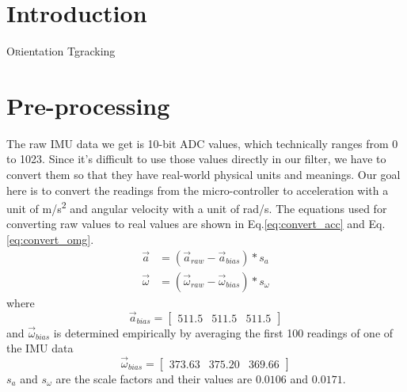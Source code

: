 \documentclass[twoside]{article}
\begin{document}
\begin{multicols}{2} %

\section{Introduction}
\lettrine[nindent=0em,lines=2]{O}rientation Tgracking


\section{Pre-processing}
The raw IMU data we get is 10-bit ADC values, which technically ranges from 0 to 1023. Since it's difficult to use those values directly in our filter, we have to convert them so that they have real-world physical units and meanings. Our goal here is to convert the readings from the micro-controller to acceleration with a unit of \si{m/s^2} and angular velocity with a unit of \si{\radian/s}.
The equations used for converting raw values to real values are shown in Eq.\ref{eq:convert_acc} and Eq.\ref{eq:convert_omg}.
\begin{align}
\label{eq:convert_acc}
\vec{a} &= (\vec{a}_{raw} - \vec{a}_{bias}) * s_{a}\\
\vec{\omega} &= (\vec{\omega}_{raw} - \vec{\omega}_{bias}) * s_{\omega}
\label{eq:convert_omg}
\end{align}
where 
\begin{equation}
\vec{a}_{bias} = \begin{bmatrix}511.5 & 511.5 & 511.5\end{bmatrix}
\end{equation}
and $\vec{\omega}_{bias}$ is determined empirically by averaging the first 100 readings of one of the IMU data
\begin{equation}
\vec{\omega}_{bias} = \begin{bmatrix}373.63 & 375.20 & 369.66\end{bmatrix}
\end{equation}
$s_{a}$ and $s_{\omega}$ are the scale factors and their values are $0.0106$ and $0.0171$.



\end{multicols}
\end{document}
